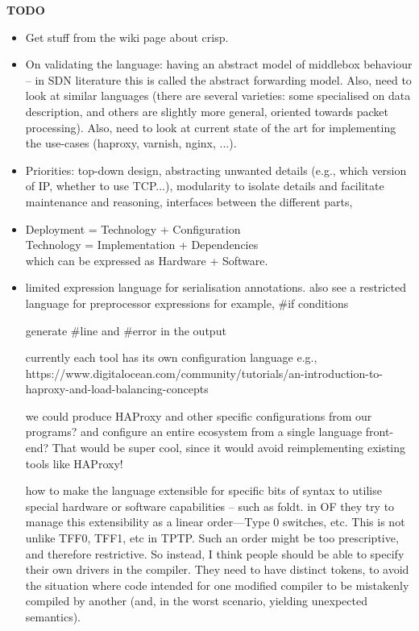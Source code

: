 \documentclass{article}
\newenvironment{todo}{\begin{mdframed}[backgroundcolor=gray!20]\bf TODO \begin{itemize}}{\end{itemize}\end{mdframed}}
\begin{document}
\begin{todo}
\item Get stuff from the wiki page about crisp.
\item On validating the language: having an abstract model of middlebox
  behaviour -- in SDN literature this is called the abstract forwarding model.
  Also, need to look at similar languages (there are several varieties: some
  specialised on data description, and others are slightly more general,
  oriented towards packet processing). Also, need to look at current state of
  the art for implementing the use-cases (haproxy, varnish, nginx, ...).
\item Priorities: top-down design, abstracting unwanted details (e.g., which
  version of IP, whether to use TCP...), modularity to isolate details and
  facilitate maintenance and reasoning, interfaces between the different parts,
\item 
  Deployment = Technology + Configuration\\
  Technology = Implementation + Dependencies\\
  which can be expressed as Hardware + Software.
\item
  limited expression language for serialisation annotations. also see a
  restricted
  language for preprocessor expressions for example, \#if conditions

  generate \#line and \#error in the output

  currently each tool has its own configuration language
    e.g.,
      https://www.digitalocean.com/community/tutorials/an-introduction-to-haproxy-and-load-balancing-concepts

      we could produce HAProxy and other specific configurations from our
      programs?
      and configure an entire ecosystem from a single language front-end? That
      would
      be super cool, since it would avoid reimplementing existing tools like
      HAProxy!

      how to make the language extensible for specific bits of syntax to utilise
      special hardware or software capabilities -- such as foldt.
      in OF they try to manage this extensibility as a linear order---Type 0
      switches, etc.
      This is not unlike TFF0, TFF1, etc in TPTP.
      Such an order might be too prescriptive, and therefore restrictive. So
      instead, I think people should be able to specify their own drivers in the
      compiler. They need to have distinct tokens, to avoid the situation where
      code intended for one modified compiler to be mistakenly compiled by
      another (and, in the worst scenario, yielding unexpected semantics).


\end{todo}
\end{document}
